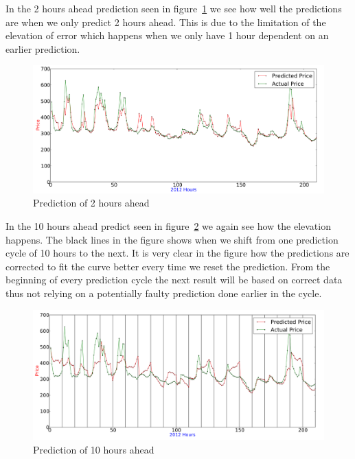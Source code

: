 In the 2 hours ahead prediction seen in figure~\ref{fig:2HoursAhead} we see how well the predictions are when we only predict 2 hours ahead. This is due to the limitation of the elevation of error which happens when we only have 1 hour dependent on an earlier prediction.

\begin{figure}[H]
\centering
\includegraphics[width=\linewidth]{billeder/PriceExperimentalAnalysis/2HoursAheadForecast.png}
\caption{Prediction of 2 hours ahead}
\label{fig:2HoursAhead}
\end{figure}

In the 10 hours ahead predict seen in figure~\ref{fig:10HoursAhead} we again see how the elevation happens. The black lines in the figure shows when we shift from one prediction cycle of 10 hours to the next. It is very clear in the figure how the predictions are corrected to fit the curve better every time we reset the prediction. From the beginning of every prediction cycle the next result will be based on correct data thus not relying on a potentially faulty prediction done earlier in the cycle.

\begin{figure}[H]
\centering
\includegraphics[width=\linewidth]{billeder/PriceExperimentalAnalysis/10HoursAhead.png}
\caption{Prediction of 10 hours ahead}
\label{fig:10HoursAhead}
\end{figure}

